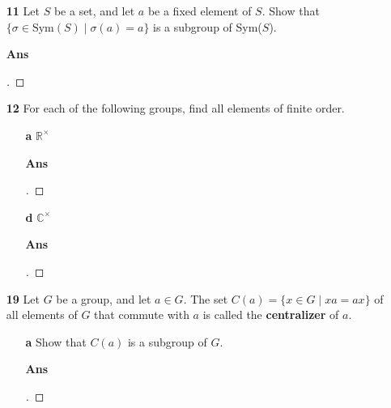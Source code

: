\documentclass[paper=usletter, fontsize=12pt]{article}
\begin{document}
\begin{itemize}
\begin{itemize}
            \item[\textbf{11}]
            Let $S$ be a set, and let $a$ be a fixed element of $S$. Show that
            $\{\sigma \in \text{Sym}(S) \mid \sigma(a)=a \}$ is a subgroup of
            Sym($S$).
            \item[\textbf{Ans}]
            \begin{proof}[\unskip\nopunct]
            \end{proof}
            \vspace{0.2in}

            \item[\textbf{12}] For each of the following groups, find all
            elements of finite order.
            \begin{enumerate}

                \item[\textbf{a}] $\mathbb{R}^{\times}$
                \item[\textbf{Ans}]
                \begin{proof}[\unskip\nopunct]
                \end{proof}
                \vspace{0.2in}

                \item[\textbf{d}] $\mathbb{C}^{\times}$
                \item[\textbf{Ans}]
                \begin{proof}[\unskip\nopunct]
                \end{proof}
                \vspace{0.2in}

            \end{enumerate}

            \item[\textbf{19}] Let $G$ be a group, and let $a \in G$. The set
            $C(a) = \{ x \in G \mid xa = ax \}$ of all elements of $G$ that
            commute with $a$ is called the \textbf{centralizer} of $a$.
            \begin{enumerate}

                \item[\textbf{a}] Show that $C(a)$ is a subgroup of $G$.
                \item[\textbf{Ans}]
                \begin{proof}[\unskip\nopunct]
                \end{proof}
                \vspace{0.2in}


\end{enumerate}
\end{itemize}
\end{itemize}
\end{document}

